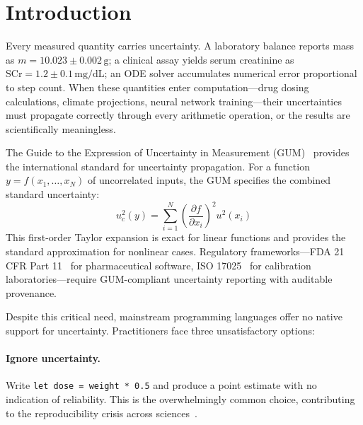 \documentclass[acmsmall,screen,review,anonymous]{acmart}
\begin{document}

\maketitle

\section{Introduction}
\label{sec:intro}

Every measured quantity carries uncertainty.
A laboratory balance reports mass as $m = 10.023 \pm 0.002\,\text{g}$;
a clinical assay yields serum creatinine as $\text{SCr} = 1.2 \pm 0.1\,\text{mg/dL}$;
an ODE solver accumulates numerical error proportional to step count.
When these quantities enter computation---drug dosing calculations,
climate projections, neural network training---their uncertainties must
propagate correctly through every arithmetic operation,
or the results are scientifically meaningless.

The Guide to the Expression of Uncertainty in Measurement
(GUM)~\cite{jcgm2008gum} provides the international standard for
uncertainty propagation.
For a function $y = f(x_1, \ldots, x_N)$ of uncorrelated inputs,
the GUM specifies the combined standard uncertainty:
\begin{equation}
  u_c^2(y) = \sum_{i=1}^{N} \left(\frac{\partial f}{\partial x_i}\right)^2 u^2(x_i)
  \label{eq:gum}
\end{equation}
This first-order Taylor expansion is exact for linear functions and
provides the standard approximation for nonlinear cases.
Regulatory frameworks---FDA 21 CFR Part 11~\cite{fda21cfr11} for pharmaceutical
software, ISO 17025~\cite{iso17025} for calibration laboratories---require
GUM-compliant uncertainty reporting with auditable provenance.

Despite this critical need, mainstream programming languages offer
no native support for uncertainty.
Practitioners face three unsatisfactory options:

\paragraph{Ignore uncertainty.}
Write \texttt{let dose = weight * 0.5} and produce a point estimate
with no indication of reliability.
This is the overwhelmingly common choice, contributing to the
reproducibility crisis across sciences~\cite{eklund2016cluster}.
\end{document}
